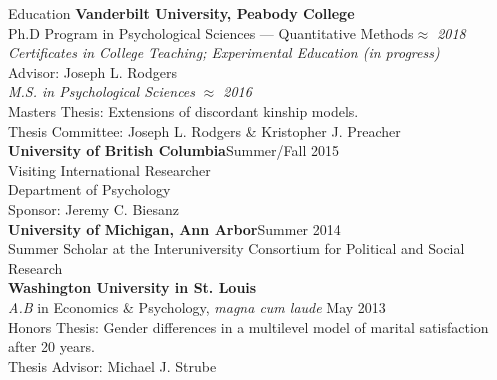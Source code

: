 
\begin{rSection}{\textrm{Education}}
{\bf Vanderbilt University, Peabody College}\\
Ph.D Program in Psychological Sciences --- Quantitative Methods\hfill  {\em $\approx$ 2018} \\
\hspace*{\pindent}\textit{Certificates in College Teaching; Experimental Education (in progress)}\\
\hspace*{\pindent}Advisor: Joseph L. Rodgers%
\smallskip\\
\textit{M.S. in Psychological Sciences} \hfill  {\em $\approx$ 2016} \\
\hspace*{\pindent}Masters Thesis: Extensions of discordant kinship models.\\
\hspace*{\pindent}Thesis Committee: Joseph L. Rodgers \& Kristopher J. Preacher%
\medskip\\
\textbf{University of British Columbia}\hfill Summer/Fall 2015\\ 
Visiting International Researcher\\%
\hspace*{\pindent}Department of Psychology\\
\hspace*{\pindent}Sponsor: Jeremy C. Biesanz\medskip\\
\textbf{University of Michigan, Ann Arbor}\hfill Summer 2014\\ 
Summer Scholar at the Interuniversity Consortium for Political and Social Research\medskip\\
{\bf Washington University in St. Louis}\\
{\em A.B} in Economics \& Psychology, \textit{magna cum laude} \hfill  {May 2013} \\
\hspace*{\pindent}Honors Thesis: Gender differences in a multilevel model of marital satisfaction after 20 years.\\
\hspace*{\pindent}Thesis Advisor: Michael J. Strube%
\end{rSection}
